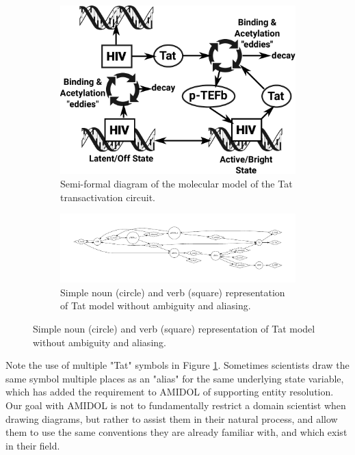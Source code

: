 \documentclass[11pt]{article}
\newcommand{\amidol}{\textsc{AMIDOL}}
\begin{document}
\begin{figure}
\begin{subfigure}[b]{\textwidth}
\includegraphics[width=\textwidth]{figs/HIV-Tat-figure.pdf}
\caption{Semi-formal diagram of the molecular model of the Tat transactivation circuit.}
\label{Fig:HIV-Tat}
\end{subfigure}
\begin{subfigure}[b]{\textwidth}
\includegraphics[width=\textwidth]{figs/TatModel.pdf}
\caption{Simple noun (circle) and verb (square) representation of Tat model without ambiguity and aliasing.}
\label{Fig:HIV-Tat-VDSOL}
\end{subfigure}
\end{figure}

Note the use of multiple "Tat" symbols in Figure \ref{Fig:HIV-Tat}. Sometimes scientists draw the same symbol multiple places as an "alias" for the same underlying state variable, which has added the requirement to \amidol{} of supporting entity resolution.  Our goal with \amidol{} is not to fundamentally restrict a domain scientist when drawing diagrams, but rather to assist them in their natural process, and allow them to use the same conventions they are already familiar with, and which exist in their field.
\end{document}
